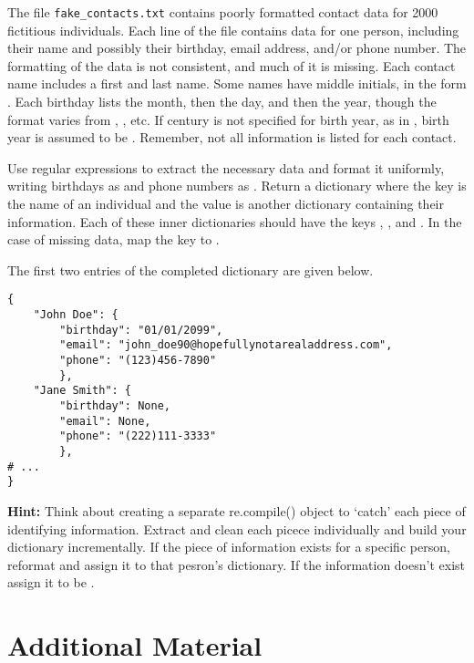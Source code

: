 \begin{problem}
The file \texttt{fake\_contacts.txt} contains poorly formatted contact data for 2000 fictitious individuals.
Each line of the file contains data for one person, including their name and possibly their birthday, email address, and/or phone number.
The formatting of the data is not consistent, and much of it is missing.
Each contact name includes a first and last name. Some names have middle initials, in the form .
Each birthday lists the month, then the day, and then the year, though the format varies from , , etc.
If century is not specified for birth year, as in , birth year is assumed to be .
Remember, not all information is listed for each contact.

Use regular expressions to extract the necessary data and format it uniformly, writing birthdays as  and phone numbers as .
Return a dictionary where the key is the name of an individual and the value is another dictionary containing their information.
Each of these inner dictionaries should have the keys , , and .
In the case of missing data, map the key to .

The first two entries of the completed dictionary are given below.

\begin{lstlisting}
{
    "John Doe": {
        "birthday": "01/01/2099",
        "email": "john_doe90@hopefullynotarealaddress.com",
        "phone": "(123)456-7890"
        },
    "Jane Smith": {
        "birthday": None,
        "email": None,
        "phone": "(222)111-3333"
        },
# ...
}
\end{lstlisting}
\raggedright
\textbf{Hint:} Think about creating a separate re.compile() object to `catch' each piece of identifying information. Extract and clean each picece individually and build your dictionary incrementally. If the piece of information exists for a specific person, reformat and assign it to that pesron's dictionary. If the information doesn't exist assign it to be .

\end{problem}


\newpage

\section*{Additional Material} %

